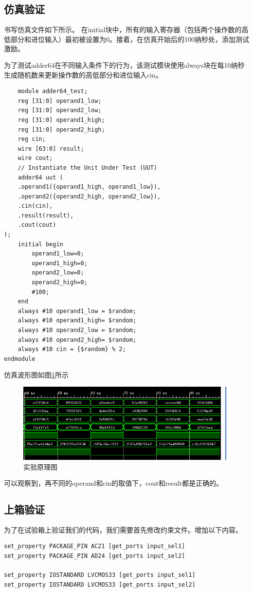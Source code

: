 \documentclass{ctexart}
\begin{document}
\subsection{仿真验证}
书写仿真文件如下所示。
在initial块中，所有的输入寄存器（包括两个操作数的高低部分和进位输入）最初被设置为0。接着，在仿真开始后的100纳秒处，添加测试激励。

为了测试adder64在不同输入条件下的行为，该测试模块使用always块在每10纳秒生成随机数来更新操作数的高低部分和进位输入cin。
\begin{verbatim}
    module adder64_test;
    reg [31:0] operand1_low;
    reg [31:0] operand2_low;
    reg [31:0] operand1_high;
    reg [31:0] operand2_high;
    reg cin;
    wire [63:0] result;
    wire cout;
    // Instantiate the Unit Under Test (UUT)
    adder64 uut (
    .operand1({operand1_high, operand1_low}), 
    .operand2({operand2_high, operand2_low}), 
    .cin(cin), 
    .result(result), 
    .cout(cout)
);
    initial begin
        operand1_low=0;
        operand1_high=0;
        operand2_low=0;
        operand2_high=0;
        #100;
    end
    always #10 operand1_low = $random;
    always #10 operand1_high= $random;
    always #10 operand2_low = $random;
    always #10 operand2_high= $random;
    always #10 cin = {$random} % 2;
endmodule
\end{verbatim}

仿真波形图如图\ref{wave}所示
\begin{figure}[ht]
    \centering
    \includegraphics[width=1\textwidth]{./figures/wave.png}
    \caption{实验原理图}
    \label{wave}
\end{figure}

可以观察到，再不同的operand和cin的取值下，cout和result都是正确的。
\subsection{上箱验证}
为了在试验箱上验证我们的代码，我们需要首先修改约束文件。增加以下内容。
\begin{verbatim}
set_property PACKAGE_PIN AC21 [get_ports input_sel1]
set_property PACKAGE_PIN AD24 [get_ports input_sel2]

set_property IOSTANDARD LVCMOS33 [get_ports input_sel1]
set_property IOSTANDARD LVCMOS33 [get_ports input_sel2]
\end{verbatim}
\end{document}

